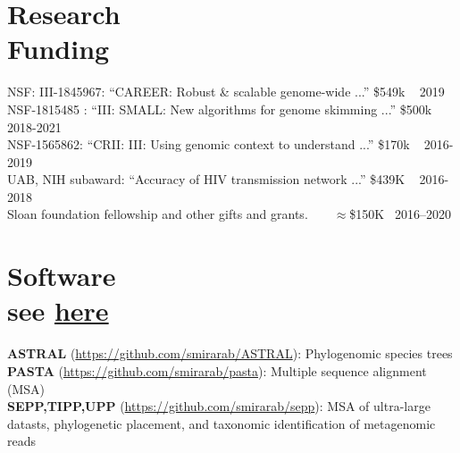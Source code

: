 \documentclass[margin,line,letterpaper]{resume}
\begin{document}
\begin{resume}
\begin{small}
 \vspace{-2mm}
    \section{\mysidestyle Research\\Funding}
      NSF: III-1845967:  ``CAREER: Robust \& scalable genome-wide ...''
 \$549k ~
 \hfill 2019\\
      NSF-1815485 :  ``III: SMALL: New algorithms for genome skimming ...''
 \hfill \$500k ~
 \hfill 2018-2021\\
 NSF-1565862:  ``CRII: III: Using genomic context to understand ...''
 \hfill  \$170k ~
 \hfill 2016-2019\\
 UAB, NIH subaward:  ``Accuracy of HIV transmission network ...''
 \hfill  \$439K ~
 \hfill 2016-2018\\
 Sloan foundation fellowship and other gifts and grants. 
 \hfill  ~ \hfill \hfill ~  \hfill $\approx$\$150K  \hfill  ~2016--2020
 
 \vspace{-2mm}
 \section{\mysidestyle Software\\ 
 see \href{http://eceweb.ucsd.edu/~smirarab/software.html}{here}}
\textbf{ASTRAL} (\url{https://github.com/smirarab/ASTRAL}):
Phylogenomic species trees\vspace{1mm}\\
\textbf{PASTA} (\url{https://github.com/smirarab/pasta}): 
Multiple sequence alignment (MSA)\vspace{1mm}\\
\textbf{SEPP,TIPP,UPP} (\url{https://github.com/smirarab/sepp}):
MSA of ultra-large datasts, phylogenetic placement, and taxonomic identification of metagenomic reads


\end{small}
\end{resume}
\end{document}
